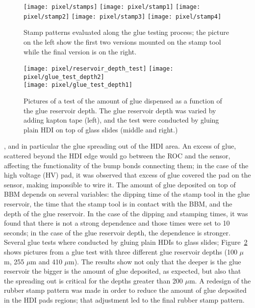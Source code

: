 \begin{figure}[!h]
  \centering  
  \texttt{[image: pixel/stamps]}
  \texttt{[image: pixel/stamp1]}
  \texttt{[image: pixel/stamp2]}
  \texttt{[image: pixel/stamp3]}
  \texttt{[image: pixel/stamp4]}
  \caption[Stamp patterns]{Stamp patterns evaluated along the glue testing process; the picture on the left show the first two versions mounted on the stamp tool while the final version is on the right.}\label{fig:stamp_pattern}
\end{figure}

\bit
  \begin{figure}[!h]
  \centering
  \texttt{[image: pixel/reservoir\_depth\_test]}
  \texttt{[image: pixel/glue\_test\_depth2]}\\
  \texttt{[image: pixel/glue\_test\_depth1]}
  \caption[Test of amount of glue deposited.]{Pictures of a test of the amount of glue dispensed as a function of the glue reservoir depth. The glue reservoir depth was varied by adding kapton tape (left), and the test were conducted by gluing plain HDI on top of glass slides (middle and right.)}\label{fig:glue_test_depth}
\end{figure}

\item {}, and in particular the glue spreading out of the HDI area. An excess of glue, scattered beyond the HDI edge would go between the ROC and the sensor, affecting the functionality of the bump bonds connecting them; in the case of the high voltage (HV) pad, it was observed that excess of glue covered the pad on the sensor, making impossible to wire it. The amount of glue deposited on  top of BBM depends on several variables: the dipping time of the stamp tool in the glue reservoir, the time that the stamp tool is in contact with the BBM, and the depth of the glue reservoir. In the case of the dipping and stamping times, it was found that there is not a strong dependence and those times were set to 10 seconds; in the case of the glue reservoir depth, the dependence is stronger. Several glue tests where conducted by gluing plain HDIs to glass slides; Figure~\ref{fig:glue_test_depth} shows pictures from a glue test with three different glue reservoir depths (100 $\mu$m, 255 $\mu$m and 410 $\mu$m). The results show not only that the deeper is the glue reservoir the bigger is the amount of glue deposited, as expected, but also that the spreading out is critical for the depths greater than 200 $\mu$m. A redesign of the rubber stamp pattern was made in order to reduce the amount of glue deposited in the HDI pads regions; that adjustment led to the final rubber stamp pattern.

